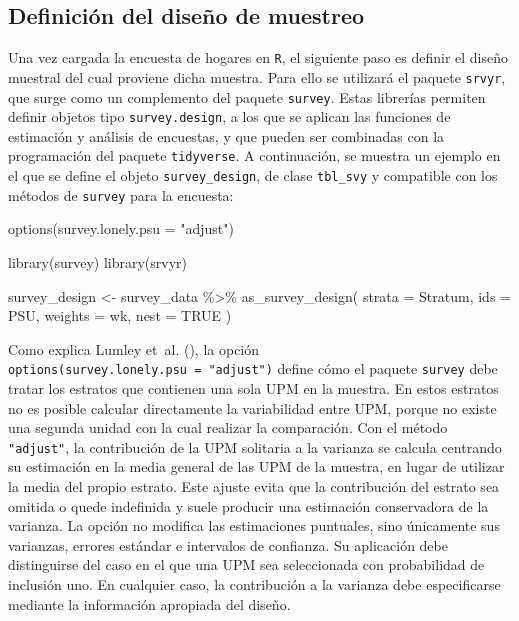 \documentclass[
  spanish,
  11pt,
  letterpaper,
  oneside,
  open=any]{scrbook}
\newenvironment{Shaded}{\begin{snugshade}}{\end{snugshade}}
\newcommand{\AttributeTok}[1]{\textcolor[rgb]{0.40,0.45,0.13}{#1}}
\newcommand{\ConstantTok}[1]{\textcolor[rgb]{0.56,0.35,0.01}{#1}}
\newcommand{\FunctionTok}[1]{\textcolor[rgb]{0.28,0.35,0.67}{#1}}
\newcommand{\NormalTok}[1]{\textcolor[rgb]{0.00,0.23,0.31}{#1}}
\newcommand{\OtherTok}[1]{\textcolor[rgb]{0.00,0.23,0.31}{#1}}
\newcommand{\SpecialCharTok}[1]{\textcolor[rgb]{0.37,0.37,0.37}{#1}}
\newcommand{\StringTok}[1]{\textcolor[rgb]{0.13,0.47,0.30}{#1}}
\begin{document}
\subsection{Definición del diseño de
muestreo}\label{definicion-del-diseno}

Una vez cargada la encuesta de hogares en \texttt{R}, el siguiente paso
es definir el diseño muestral del cual proviene dicha muestra. Para ello
se utilizará el paquete \texttt{srvyr}, que surge como un complemento
del paquete \texttt{survey}. Estas librerías permiten definir objetos
tipo \texttt{survey.design}, a los que se aplican las funciones de
estimación y análisis de encuestas, y que pueden ser combinadas con la
programación del paquete \texttt{tidyverse}. A continuación, se muestra
un ejemplo en el que se define el objeto \texttt{survey\_design}, de
clase \texttt{tbl\_svy} y compatible con los métodos de \texttt{survey}
para la encuesta:

\begin{Shaded}
\begin{Highlighting}[]
\FunctionTok{options}\NormalTok{(}\AttributeTok{survey.lonely.psu =} \StringTok{"adjust"}\NormalTok{)}

\FunctionTok{library}\NormalTok{(survey)}
\FunctionTok{library}\NormalTok{(srvyr)}

\NormalTok{survey\_design }\OtherTok{\textless{}{-}}\NormalTok{ survey\_data }\SpecialCharTok{\%\textgreater{}\%}
  \FunctionTok{as\_survey\_design}\NormalTok{(}
    \AttributeTok{strata =}\NormalTok{ Stratum,}
    \AttributeTok{ids =}\NormalTok{ PSU,}
    \AttributeTok{weights =}\NormalTok{ wk,}
    \AttributeTok{nest =} \ConstantTok{TRUE}
\NormalTok{  )}
\end{Highlighting}
\end{Shaded}

Como explica Lumley et~al. (), la opción
\texttt{options(survey.lonely.psu\ =\ "adjust")} define cómo el paquete
\texttt{survey} debe tratar los estratos que contienen una sola UPM en
la muestra. En estos estratos no es posible calcular directamente la
variabilidad entre UPM, porque no existe una segunda unidad con la cual
realizar la comparación. Con el método \texttt{"adjust"}, la
contribución de la UPM solitaria a la varianza se calcula centrando su
estimación en la media general de las UPM de la muestra, en lugar de
utilizar la media del propio estrato. Este ajuste evita que la
contribución del estrato sea omitida o quede indefinida y suele producir
una estimación conservadora de la varianza. La opción no modifica las
estimaciones puntuales, sino únicamente sus varianzas, errores estándar
e intervalos de confianza. Su aplicación debe distinguirse del caso en
el que una UPM sea seleccionada con probabilidad de inclusión uno. En
cualquier caso, la contribución a la varianza debe especificarse
mediante la información apropiada del diseño.
\end{document}
